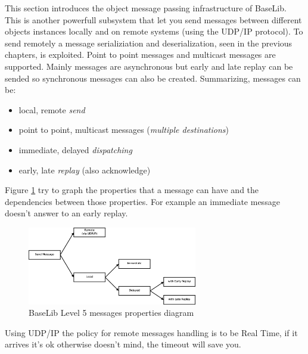 This section introduces the object message passing infrastructure of BaseLib. This is another powerfull subsystem that let you send messages between different objects instances locally and on remote systems (using the UDP/IP protocol). To send remotely a message serializiation and deserialization, seen in the previous chapters, is exploited. Point to point messages and multicast messages are supported. Mainly messages are asynchronous but early and late replay can be sended so synchronous messages can also be created. Summarizing, messages can be:
\begin{itemize}
 \item local, remote \textit{send}
 \item point to point, multicast messages (\textit{multiple destinations})
 \item immediate, delayed \textit{dispatching}
 \item early, late \textit{replay} (also acknowledge)
\end{itemize}

Figure \ref{f:level5:MSGprop} try to graph the properties that a message can have and the dependencies between those properties. For example an immediate message doesn't answer to an early replay.

\begin{figure}[h!]
 \begin{center}
  \includegraphics[width=0.66\textwidth]{level5/MessagesProp.eps} 
  \caption{BaseLib Level 5 messages properties diagram}
  \label{f:level5:MSGprop}
 \end{center}
\end{figure}


Using UDP/IP the policy for remote messages handling is to be Real Time, if it arrives it's ok otherwise doesn't mind, the timeout will save you.

